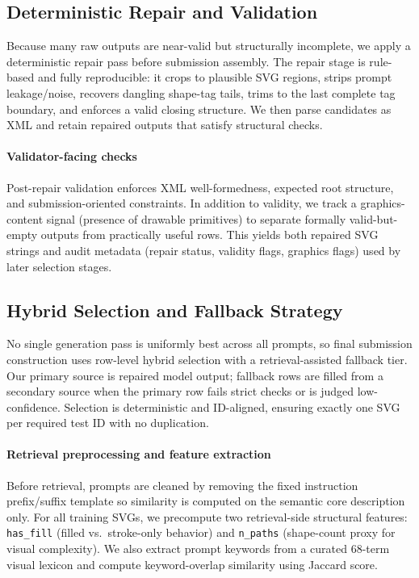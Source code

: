 \documentclass[11pt]{article}
\begin{document}
\subsection{Deterministic Repair and Validation}
Because many raw outputs are near-valid but structurally incomplete, we apply a deterministic repair pass before submission assembly.
The repair stage is rule-based and fully reproducible: it crops to plausible SVG regions, strips prompt leakage/noise, recovers dangling shape-tag tails, trims to the last complete tag boundary, and enforces a valid closing structure.
We then parse candidates as XML and retain repaired outputs that satisfy structural checks.

\paragraph{Validator-facing checks}
Post-repair validation enforces XML well-formedness, expected root structure, and submission-oriented constraints.
In addition to validity, we track a graphics-content signal (presence of drawable primitives) to separate formally valid-but-empty outputs from practically useful rows.
This yields both repaired SVG strings and audit metadata (repair status, validity flags, graphics flags) used by later selection stages.

\subsection{Hybrid Selection and Fallback Strategy}
No single generation pass is uniformly best across all prompts, so final submission construction uses row-level hybrid selection with a retrieval-assisted fallback tier.
Our primary source is repaired model output; fallback rows are filled from a secondary source when the primary row fails strict checks or is judged low-confidence.
Selection is deterministic and ID-aligned, ensuring exactly one SVG per required test ID with no duplication.

\paragraph{Retrieval preprocessing and feature extraction}
Before retrieval, prompts are cleaned by removing the fixed instruction prefix/suffix template so similarity is computed on the semantic core description only.
For all training SVGs, we precompute two retrieval-side structural features: \texttt{has\_fill} (filled vs.\ stroke-only behavior) and \texttt{n\_paths} (shape-count proxy for visual complexity).
We also extract prompt keywords from a curated 68-term visual lexicon and compute keyword-overlap similarity using Jaccard score.
\end{document}
